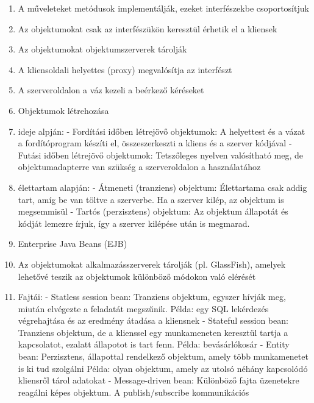 \documentclass[twoside, a4paper, 12pt]{article}
\begin{document}
\begin{enumerate}
            \item A műveleteket metódusok implementálják, ezeket interfészekbe csoportosítjuk
            \item Az objektumokat csak az interfészükön keresztül érhetik el a kliensek
            \item Az objektumokat objektumszerverek tárolják
            \item A kliensoldali helyettes (proxy) megvalósítja az interfészt
            \item A szerveroldalon a váz kezeli a beérkező kéréseket
            \item  Objektumok létrehozása
            \item ideje alpján:
                - Fordítási időben létrejövő objektumok: A helyettest és a vázat a fordítóprogram készíti el,
                összeszerkeszti a kliens és a szerver kódjával
                - Futási időben létrejövő objektumok: Tetszőleges nyelven valósítható meg, de objektumadapterre van
                szükség a szerveroldalon a használatához
            \item élettartam alapján:
                - Átmeneti (tranziens) objektum: Élettartama csak addig tart, amíg be van töltve a szerverbe. 
                Ha a szerver kilép, az objektum is megsemmisül
                - Tartós (perzisztens) objektum: Az objektum állapotát és kódját lemezre írjuk, így a szerver kilépése után
                is megmarad.
            \item  Enterprise Java Beans (EJB)
            \item Az objektumokat alkalmazásszerverek tárolják (pl. GlassFish), amelyek lehetővé teszik az objektumok
                különböző módokon való elérését
            \item Fajtái:
                - Statless session bean: Tranziens objektum, egyszer hívják meg, miután elvégezte a feladatát megszűnik.
                Példa: egy SQL lekérdezés végrehajtása és az eredmény átadása a kliensnek
                - Stateful session bean: Tranziens objektum, de a klienssel egy munkameneten keresztül tartja a kapcsolatot,
                ezalatt állapotot is tart fenn. Példa: bevásárlókosár
                - Entity bean: Perzisztens, állapottal rendelkező objektum, amely több munkamenetet is ki tud szolgálni
                Példa: olyan objektum, amely az utolsó néhány kapcsolódó kliensről tárol adatokat
                - Message-driven bean: Különböző fajta üzenetekre reagálni képes objektum. A publish/subscribe kommunikációs

\end{enumerate}
\end{document}
